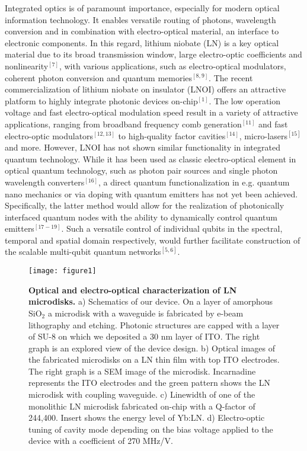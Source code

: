 \documentclass[prl,reprint,superscriptaddress]{revtex4-1}
\begin{document}
Integrated optics is of paramount importance, especially for modern optical information technology. It enables versatile routing of photons, wavelength conversion and in combination with electro-optical material, an interface to electronic components. In this regard, lithium niobate (LN) is a key optical material due to its broad transmission window, large electro-optic coefficients and nonlinearity$^{[7]}$, with various applications, such as electro-optical modulators, coherent photon conversion and quantum memories$^{[8,9]}$. The recent commercialization of lithium niobate on insulator (LNOI) offers an attractive platform to highly integrate photonic devices on-chip$^{[1]}$. The low operation voltage and fast electro-optical modulation speed result in a variety of attractive applications, ranging from broadband frequency comb generation$^{[11]}$ and fast electro-optic modulators$^{[12,13]}$ to high-quality factor cavities$^{[14]}$, micro-lasers$^{[15]}$ and more. However, LNOI has not shown similar functionality in integrated quantum technology. While it has been used as classic electro-optical element in optical quantum technology, such as photon pair sources and single photon wavelength converters$^{[16]}$, a direct quantum functionalization in e.g. quantum nano mechanics or via doping with quantum emitters has not yet been achieved. Specifically, the latter method would allow for the realization of photonically interfaced quantum nodes with the ability to dynamically control quantum emitters$^{[17-19]}$. Such a versatile control of individual qubits in the spectral, temporal and spatial domain respectively, would further facilitate  construction of the scalable multi-qubit quantum networks$^{[5,6]}$.
  
  \begin{figure}
\texttt{[image: figure1]}%
\caption{ \textbf{Optical and electro-optical characterization of LN microdisks.} a) Schematics of our device. On a layer of amorphous SiO$_2$ a microdisk with a waveguide is fabricated by e-beam lithography and etching. Photonic structures are capped with a layer of SU-8 on which we deposited a 30 nm layer of ITO. The right graph is an explored view of the device design. b) Optical images of the fabricated microdisks on a LN thin film with top ITO electrodes. The right graph is a SEM image of the microdisk. Incarnadine represents the ITO electrodes and the green pattern shows the LN microdisk with coupling waveguide. c) Linewidth of one of the monolithic LN microdisk fabricated on-chip with a Q-factor of 244,400. Insert shows the energy level of Yb:LN. d) Electro-optic tuning of cavity mode depending on the bias voltage applied to the device with a coefficient of 270 MHz/V. \label{figure1}}
\end{figure}  
\end{document}
